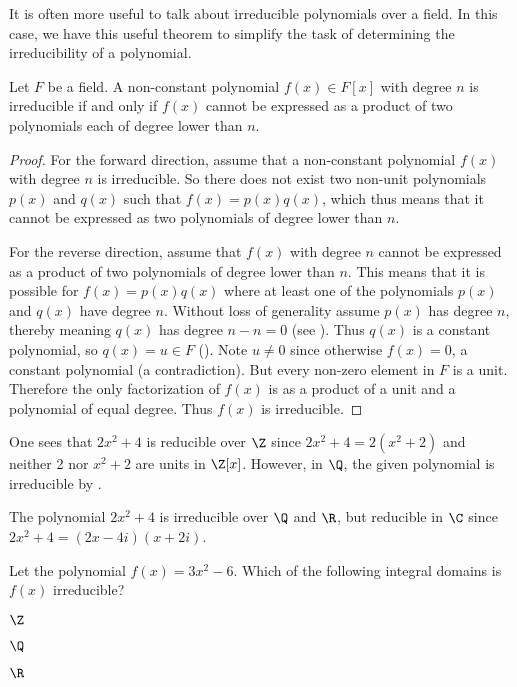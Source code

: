 It is often more useful to talk about irreducible polynomials over a field. In this case, we have this useful theorem to simplify the task of determining the irreducibility of a polynomial.
\begin{theorem}\label{thrm-irreducible-iff-not-expressable-as-product-of-smaller-polynomials}
    Let $F$ be a field. A non-constant polynomial $f(x) \in F[x]$ with degree $n$ is irreducible if and only if $f(x)$ cannot be expressed as a product of two polynomials each of degree lower than $n$.
\end{theorem}
\begin{proof}
    For the forward direction, assume that a non-constant polynomial $f(x)$ with degree $n$ is irreducible. So there does not exist two non-unit polynomials $p(x)$ and $q(x)$ such that $f(x) = p(x)q(x)$, which thus means that it cannot be expressed as two polynomials of degree lower than $n$.

    For the reverse direction, assume that $f(x)$ with degree $n$ cannot be expressed as a product of two polynomials of degree lower than $n$. This means that it is possible for $f(x) = p(x)q(x)$ where at least one of the polynomials $p(x)$ and $q(x)$ have degree $n$. Without loss of generality assume $p(x)$ has degree $n$, thereby meaning $q(x)$ has degree $n - n = 0$ (see ). Thus $q(x)$ is a constant polynomial, so $q(x) = u \in F$ (). Note $u \neq 0$ since otherwise $f(x) = 0$, a constant polynomial (a contradiction). But every non-zero element in $F$ is a unit. Therefore the only factorization of $f(x)$ is as a product of a unit and a polynomial of equal degree. Thus $f(x)$ is irreducible.
\end{proof}

\begin{example}
    One sees that $2x^2 + 4$ is reducible over $\Z$ since $2x^2 + 4 = 2(x^2 + 2)$ and neither 2 nor $x^2 + 2$ are units in $\Z[x]$. However, in $\Q$, the given polynomial is irreducible by .
\end{example}

\begin{example}
    The polynomial $2x^2 + 4$ is irreducible over $\Q$ and $\R$, but reducible in $\C$ since $2x^2 + 4 = (2x-4i)(x+2i)$.
\end{example}

\begin{exercise}
    Let the polynomial $f(x) = 3x^2 - 6$. Which of the following integral domains is $f(x)$ irreducible?
    \begin{partquestions}{\alph*}
        \item $\Z$
        \item $\Q$
        \item $\R$
    \end{partquestions} 
\end{exercise}

